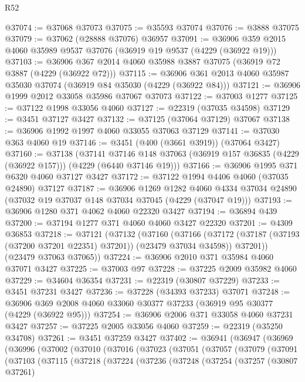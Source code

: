 \begin{lexlean}{R52}
\begin{coremodule}
@37074 := @37068 @37073
@37075 := @35593 @37074
@37076 := @3888 @37075
@37079 := @37062 (@28888 @37076) @36957
@37091 := @36906 @359 @2015 @4060 @35989 @9537 @37076 (@36919 @19 @9537 (@4229 (@36922 @19)))
@37103 := @36906 @367 @2014 @4060 @35988 @3887 @37075 (@36919 @72 @3887 (@4229 (@36922 @72)))
@37115 := @36906 @361 @2013 @4060 @35987 @35030 @37074 (@36919 @84 @35030 (@4229 (@36922 @84)))
@37121 := @36906 @1999 @2012 @33058 @35986 @37067 @37073
@37122 := @37003 @1277
@37125 := @37122 @1998 @33056 @4060
@37127 := @22319 (@37035 @34598)
@37129 := @3451 @37127 @3427
@37132 := @37125 (@37064 @37129) @37067
@37138 := @36906 @1992 @1997 @4060 @33055 @37063 @37129
@37141 := @37030 @363 @4060 @19
@37146 := @3451 (@400 (@3661 @3919)) (@37064 @3427)
@37160 := @37138
    (@37141
      @37146
      @148
      @37063
      (@36919 @157 @36835 (@4229 (@36922 @157)))
      (@4229 (@6440 @37146 @19)))
@37166 := @36906 @1995 @371 @6320 @4060 @37127 @3427
@37172 := @37122 @1994 @4406 @4060 (@37035 @24890) @37127
@37187 := @36906
    @1269
    @1282
    @4060
    @4334
    @37034
    @24890
    (@37032 @19 @37037 @148 @37034 @37045 (@4229 (@37047 @19)))
@37193 := @36906 @1280 @371 @4062 @4060 @22320 @3427
@37194 := @36894 @439
@37200 := @37194 @1277 @371 @4060 @4060 @3427 @22320
@37201 := @4309 @36853
@37218 := @37121
    (@37132
      (@37160
        (@37166
          (@37172 (@37187 (@37193 (@37200 @37201 @22351) @37201)) (@23479 @37034 @34598))
          @37201))
      (@23479 @37063 @37065))
@37224 := @36906 @2010 @371 @35984 @4060 @37071 @3427
@37225 := @37003 @97
@37228 := @37225 @2009 @35982 @4060
@37229 := @34604 @36354
@37231 := @22319 (@30807 @37229)
@37233 := @3451 @37231 @3427
@37236 := @37228 (@34393 @37233) @37071
@37248 := @36906 @369 @2008 @4060 @33060 @30377 @37233 (@36919 @95 @30377 (@4229 (@36922 @95)))
@37254 := @36906 @2006 @371 @33058 @4060 @37231 @3427
@37257 := @37225 @2005 @33056 @4060
@37259 := @22319 (@35250 @34708)
@37261 := @3451 @37259 @3427
@37402 := @36941
    (@36947
      (@36969
        (@36996
          (@37002
            (@37010
              (@37016
                (@37023
                  (@37051
                    (@37057
                      (@37079
                        (@37091
                          (@37103
                            (@37115
                              (@37218
                                (@37224
                                  (@37236
                                    (@37248
                                      (@37254
                                        (@37257
                                          (@30807 @37261)

\end{coremodule}
\end{lexlean}
